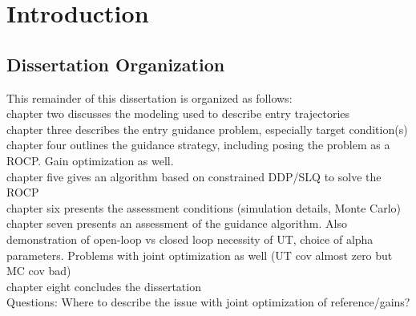 \chapter{Introduction}


\section{Dissertation Organization}
This remainder of this dissertation is organized as follows: \\
chapter two discusses the modeling used to describe entry trajectories\\
chapter three describes the entry guidance problem, especially target condition(s)\\
chapter four outlines the guidance strategy, including posing the problem as a ROCP. Gain optimization as well. \\
chapter five gives an algorithm based on constrained DDP/SLQ to solve the ROCP \\
chapter six presents the assessment conditions (simulation details, Monte Carlo) \\
chapter seven presents an assessment of the guidance algorithm. Also demonstration of open-loop vs closed loop necessity of UT, choice of alpha parameters. Problems with joint optimization as well (UT cov almost zero but MC cov bad) \\
chapter eight concludes the dissertation \\

Questions: 
Where to describe the issue with joint optimization of reference/gains?

